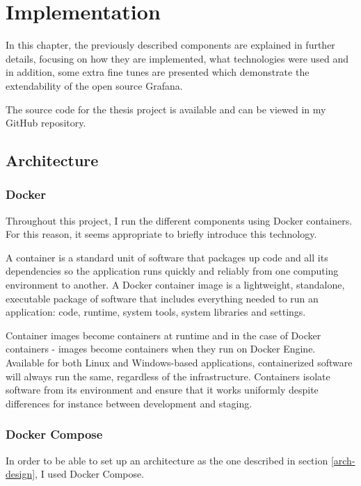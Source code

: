 \chapter{Implementation}

In this chapter, the previously described components are explained in further details, focusing on how they are implemented, what technologies were used and in addition, some extra fine tunes are presented which demonstrate the extendability of the open source Grafana.

The source code for the thesis project is available and can be viewed in my GitHub repository.\cite{thesis-repo}

\section{Architecture}

\subsection{Docker}

Throughout this project, I run the different components using Docker containers. For this reason, it seems appropriate to briefly introduce this technology.

A container is a standard unit of software that packages up code and all its dependencies so the application runs quickly and reliably from one computing environment to another. A Docker container image is a lightweight, standalone, executable package of software that includes everything needed to run an application: code, runtime, system tools, system libraries and settings.

Container images become containers at runtime and in the case of Docker containers - images become containers when they run on Docker Engine. Available for both Linux and Windows-based applications, containerized software will always run the same, regardless of the infrastructure. Containers isolate software from its environment and ensure that it works uniformly despite differences for instance between development and staging.\cite{docker}


\subsection{Docker Compose}

In order to be able to set up an architecture as the one described in section \ref{arch-design}, I used Docker Compose.

